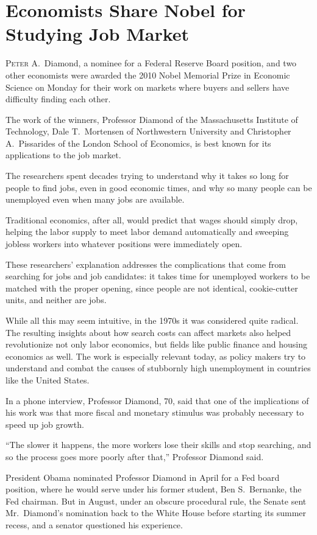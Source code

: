﻿\documentclass[12pt]{article}
\begin{document}
\section{Economists Share Nobel for Studying Job Market}

\lettrine{P}{eter} A.~Diamond, a nominee for a Federal Reserve Board
position, and two other economists were awarded the 2010 Nobel Memorial Prize in Economic Science on
Monday for their work on markets where buyers and sellers have difficulty finding each other.

The work of the winners, Professor Diamond of the Massachusetts Institute of Technology, Dale
T.~Mortensen of Northwestern University and Christopher A.~Pissarides of the London School of
Economics, is best known for its applications to the job market.

The researchers spent decades trying to understand why it takes so long for people to find jobs,
even in good economic times, and why so many people can be unemployed even when many jobs are
available.

Traditional economics, after all, would predict that wages should simply drop, helping the labor
supply to meet labor demand automatically and sweeping jobless workers into whatever positions were
immediately open.

These researchers' explanation addresses the complications that come from searching for jobs and job
candidates: it takes time for unemployed workers to be matched with the proper opening, since people
are not identical, cookie-cutter units, and neither are jobs.

While all this may seem intuitive, in the 1970s it was considered quite radical. The resulting
insights about how search costs can affect markets also helped revolutionize not only labor
economics, but fields like public finance and housing economics as well. The work is especially
relevant today, as policy makers try to understand and combat the causes of stubbornly high
unemployment in countries like the United States.

In a phone interview, Professor Diamond, 70, said that one of the implications of his work was that
more fiscal and monetary stimulus was probably necessary to speed up job growth.

``The slower it happens, the more workers lose their skills and stop searching, and so the process
goes more poorly after that,'' Professor Diamond said.

President Obama nominated Professor Diamond in April for a Fed board position, where he would serve
under his former student, Ben S.~Bernanke, the Fed chairman. But in August, under an obscure
procedural rule, the Senate sent Mr.~Diamond's nomination back to the White House before starting
its summer recess, and a senator questioned his experience.
\end{document}

